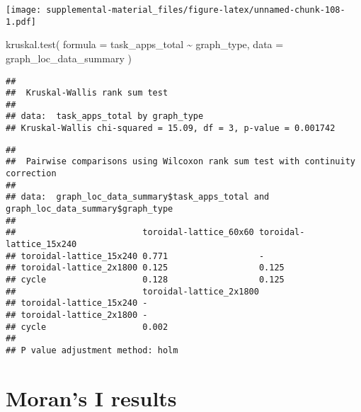 \documentclass[
]{book}
\newenvironment{Shaded}{\begin{snugshade}}{\end{snugshade}}
\newcommand{\AttributeTok}[1]{\textcolor[rgb]{0.77,0.63,0.00}{#1}}
\newcommand{\ConstantTok}[1]{\textcolor[rgb]{0.00,0.00,0.00}{#1}}
\newcommand{\FunctionTok}[1]{\textcolor[rgb]{0.00,0.00,0.00}{#1}}
\newcommand{\NormalTok}[1]{#1}
\newcommand{\OtherTok}[1]{\textcolor[rgb]{0.56,0.35,0.01}{#1}}
\newcommand{\SpecialCharTok}[1]{\textcolor[rgb]{0.00,0.00,0.00}{#1}}
\newcommand{\StringTok}[1]{\textcolor[rgb]{0.31,0.60,0.02}{#1}}
\begin{document}
\texttt{[image: supplemental-material\_files/figure-latex/unnamed-chunk-108-1.pdf]}

\begin{Shaded}
\begin{Highlighting}[]
\FunctionTok{kruskal.test}\NormalTok{(}
  \AttributeTok{formula =}\NormalTok{ task\_apps\_total }\SpecialCharTok{\textasciitilde{}}\NormalTok{ graph\_type,}
  \AttributeTok{data =}\NormalTok{ graph\_loc\_data\_summary}
\NormalTok{)}
\end{Highlighting}
\end{Shaded}

\begin{verbatim}
## 
##  Kruskal-Wallis rank sum test
## 
## data:  task_apps_total by graph_type
## Kruskal-Wallis chi-squared = 15.09, df = 3, p-value = 0.001742
\end{verbatim}

\begin{Shaded}
\end{Shaded}

\begin{verbatim}
## 
##  Pairwise comparisons using Wilcoxon rank sum test with continuity correction 
## 
## data:  graph_loc_data_summary$task_apps_total and graph_loc_data_summary$graph_type 
## 
##                         toroidal-lattice_60x60 toroidal-lattice_15x240
## toroidal-lattice_15x240 0.771                  -                      
## toroidal-lattice_2x1800 0.125                  0.125                  
## cycle                   0.128                  0.125                  
##                         toroidal-lattice_2x1800
## toroidal-lattice_15x240 -                      
## toroidal-lattice_2x1800 -                      
## cycle                   0.002                  
## 
## P value adjustment method: holm
\end{verbatim}

\hypertarget{morans-i-results}{%
\section{Moran's I results}\label{morans-i-results}}
\end{document}
